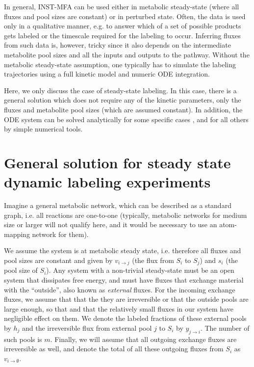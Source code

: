 \documentclass{article}
\newcommand{\flux}[2]{\ensuremath{v_{{#1} \rightarrow {#2}}}}
\begin{document}
In general, INST-MFA can be used either in metabolic steady-state (where all fluxes and pool sizes are constant) or in perturbed state. Often, the data is used only in a qualitative manner, e.g. to answer which of a set of possible products gets labeled or the timescale required for the labeling to occur. Inferring fluxes from such data is, however, tricky since it also depends on the intermediate metabolite pool sizes and all the inputs and outputs to the pathway. Without the metabolic steady-state assumption, one typically has to simulate the labeling trajectories using a full kinetic model and numeric ODE integration.

Here, we only discuss the case of steady-state labeling. In this case, there is a general solution \cite{young_elementary_2008} which does not require any of the kinetic parameters, only the fluxes and metabolite pool sizes (which are assumed constant). In addition, the ODE system can be solved analytically for some specific cases \cite{sokol_theoretical_2015}, and for all others by simple numerical tools.

\section{General solution for steady state dynamic labeling experiments}
Imagine a general metabolic network, which can be described as a standard graph, i.e. all reactions are one-to-one (typically, metabolic networks for medium size or larger will not qualify here, and it would be necessary to use an atom-mapping network for them).

We assume the system is at metabolic steady state, i.e. therefore all fluxes and pool sizes are constant and given by \flux{i}{j} (the flux from $S_i$ to $S_j$) and $s_i$ (the pool size of $S_i$). Any system with a non-trivial steady-state must be an open system that dissipates free energy, and must have fluxes that exchange material with the ``outside'', also known as \textit{external} fluxes. For the incoming exchange fluxes, we assume that that the they are irreversible or that the outside pools are large enough, so that and that the relatively small fluxes in our system have negligible effect on them. We denote the labeled fractions of these external pools by $h_j$ and the irreversible flux from external pool $j$ to $S_i$ by $y_{j \rightarrow i}$. The number of such pools is $m$. Finally, we will assume that all outgoing exchange fluxes are irreversible as well, and denote the total of all these outgoing fluxes from $S_i$ as $\flux{i}{\emptyset}$.
\end{document}
